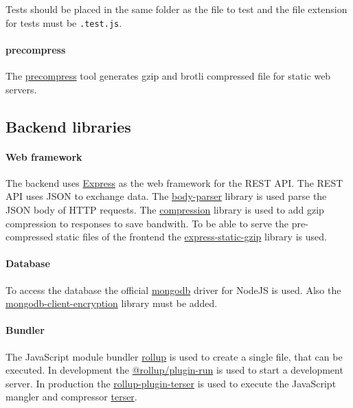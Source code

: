 Tests should be placed in the same folder as the file to test and the file extension for tests must be \texttt{.test.js}.

\paragraph{precompress}
The \href{https://www.npmjs.com/package/precompress}{precompress} tool generates gzip and brotli compressed file for static web servers.

\subsection{Backend libraries}

\paragraph{Web framework}
The backend uses \href{https://expressjs.com}{Express} as the web framework for the REST API.
The REST API uses JSON to exchange data.
The \href{https://www.npmjs.com/package/body-parser}{body-parser} library is used parse the JSON body of HTTP requests.
The \href{https://www.npmjs.com/package/compression}{compression} library is used to add gzip compression to responses to save bandwith.
To be able to serve the pre-compressed static files of the frontend the \href{https://www.npmjs.com/package/express-static-gzip}{express-static-gzip} library is used.

\paragraph{Database}
To access the database the official \href{https://www.npmjs.com/package/mongodb}{mongodb} driver for NodeJS is used.
Also the \href{https://www.npmjs.com/package/mongodb-client-encryption}{mongodb-client-encryption} library must be added.

\paragraph{Bundler}
The JavaScript module bundler \href{https://rollupjs.org}{rollup} is used to create a single file, that can be executed.
In development the \href{https://www.npmjs.com/package/@rollup/plugin-run}{@rollup/plugin-run} is used to start a development server.
In production the \href{https://www.npmjs.com/package/rollup-plugin-terser}{rollup-plugin-terser} is used to execute the JavaScript mangler and compressor \href{https://terser.org}{terser}.
